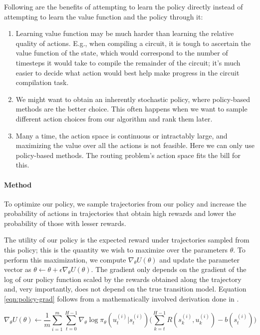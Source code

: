 Following are the benefits of attempting to learn the policy directly instead of attempting to learn the value function and the policy through it:
\begin{enumerate}
    \item Learning value function may be much harder than learning the relative quality of actions. E.g., when compiling a circuit, it is tough to ascertain the value function of the state, which would correspond to the number of timesteps it would take to compile the remainder of the circuit; it's much easier to decide what action would best help make progress in the circuit compilation task. 
    \item We might want to obtain an inherently stochastic policy, where policy-based methods are the better choice. This often happens when we want to sample different action choices from our algorithm and rank them later.
    \item Many a time, the action space is continuous or intractably large, and maximizing the value over all the actions is not feasible. Here we can only use policy-based methods. The routing problem's action space fits the bill for this.
\end{enumerate}

\paragraph{Method}
To optimize our policy, we sample trajectories from our policy and increase the probability of actions in trajectories that obtain high rewards and lower the probability of those with lesser rewards.

The utility of our policy is the expected reward under trajectories sampled from this policy; this is the quantity we wish to maximize over the parameters $\theta$. To perform this maximization, we compute $\nabla_\theta U(\theta)$ and update the parameter vector as $\theta \leftarrow \theta + \epsilon \nabla_\theta U(\theta)$. The gradient only depends on the gradient of the log of our policy function scaled by the rewards obtained along the trajectory and, very importantly, does not depend on the true transition model. Equation \ref{eqn:policy-grad} follows from a mathematically involved derivation done in \cite{policy-grad-theorem}.

\begin{equation}\label{eqn:policy-grad}
    \nabla_\theta U(\theta) \leftarrow \frac{1}{m} \sum_{i=1}^{m} \sum_{t=0}^{H-1} \nabla_\theta \log \pi_\theta (u_t^{(i)}|s_t^{(i)}) \Bigg(\sum_{k=t}^{H-1} R(s_k^{(i)}, u_k^{(i)}) - b(s_t^{(i)})\Bigg)
\end{equation}


